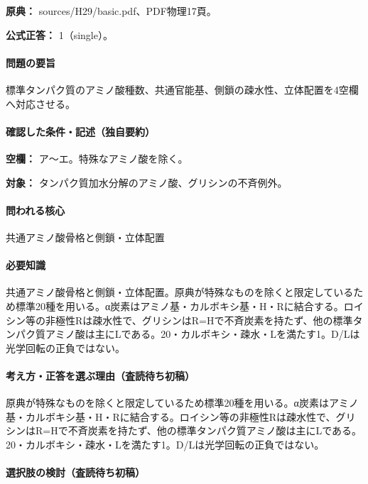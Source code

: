 \noindent\textbf{原典：} sources/H29/basic.pdf、PDF物理17頁。

\textbf{公式正答：} 1（single）。

\paragraph{問題の要旨} 標準タンパク質のアミノ酸種数、共通官能基、側鎖の疎水性、立体配置を4空欄へ対応させる。

\paragraph{確認した条件・記述（独自要約）}\mbox{}\par

\noindent\textbf{空欄：} ア〜エ。特殊なアミノ酸を除く。\par

\noindent\textbf{対象：} タンパク質加水分解のアミノ酸、グリシンの不斉例外。\par

\paragraph{問われる核心} 共通アミノ酸骨格と側鎖・立体配置

\paragraph{必要知識} 共通アミノ酸骨格と側鎖・立体配置。原典が特殊なものを除くと限定しているため標準20種を用いる。α炭素はアミノ基・カルボキシ基・H・Rに結合する。ロイシン等の非極性Rは疎水性で、グリシンはR=\allowbreak{}Hで不斉炭素を持たず、他の標準タンパク質アミノ酸は主にLである。20・カルボキシ・疎水・Lを満たす1。D/Lは光学回転の正負ではない。

\paragraph{考え方・正答を選ぶ理由（査読待ち初稿）} 原典が特殊なものを除くと限定しているため標準20種を用いる。α炭素はアミノ基・カルボキシ基・H・Rに結合する。ロイシン等の非極性Rは疎水性で、グリシンはR=\allowbreak{}Hで不斉炭素を持たず、他の標準タンパク質アミノ酸は主にLである。20・カルボキシ・疎水・Lを満たす1。D/Lは光学回転の正負ではない。

\paragraph{選択肢の検討（査読待ち初稿）}\mbox{}\par

